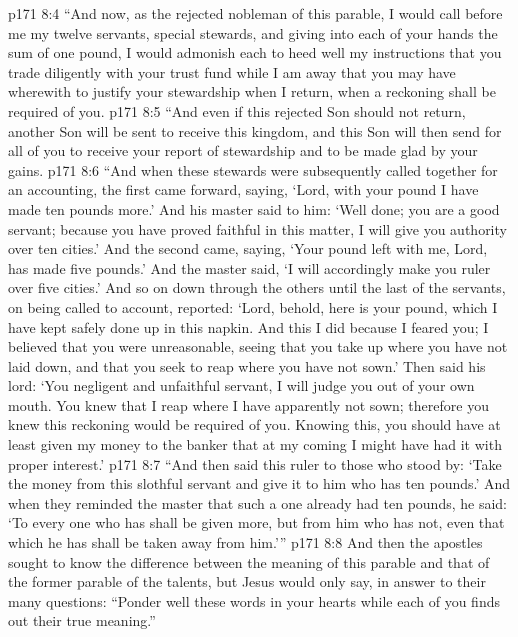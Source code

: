 \vs p171 8:4 \textcolor{ubdarkred}{“And now, as the rejected nobleman of this parable, I would call before me my twelve servants, special stewards, and giving into each of your hands the sum of one pound, I would admonish each to heed well my instructions that you trade diligently with your trust fund while I am away that you may have wherewith to justify your stewardship when I return, when a reckoning shall be required of you.}
\vs p171 8:5 \textcolor{ubdarkred}{“And even if this rejected Son should not return, another Son will be sent to receive this kingdom, and this Son will then send for all of you to receive your report of stewardship and to be made glad by your gains.}
\vs p171 8:6 \textcolor{ubdarkred}{“And when these stewards were subsequently called together for an accounting, the first came forward, saying, ‘Lord, with your pound I have made ten pounds more.’ And his master said to him: ‘Well done; you are a good servant; because you have proved faithful in this matter, I will give you authority over ten cities.’ And the second came, saying, ‘Your pound left with me, Lord, has made five pounds.’ And the master said, ‘I will accordingly make you ruler over five cities.’ And so on down through the others until the last of the servants, on being called to account, reported: ‘Lord, behold, here is your pound, which I have kept safely done up in this napkin. And this I did because I feared you; I believed that you were unreasonable, seeing that you take up where you have not laid down, and that you seek to reap where you have not sown.’ Then said his lord: ‘You negligent and unfaithful servant, I will judge you out of your own mouth. You knew that I reap where I have apparently not sown; therefore you knew this reckoning would be required of you. Knowing this, you should have at least given my money to the banker that at my coming I might have had it with proper interest.’}
\vs p171 8:7 \textcolor{ubdarkred}{“And then said this ruler to those who stood by: ‘Take the money from this slothful servant and give it to him who has ten pounds.’ And when they reminded the master that such a one already had ten pounds, he said: ‘To every one who has shall be given more, but from him who has not, even that which he has shall be taken away from him.’”}
\pc \vs p171 8:8 And then the apostles sought to know the difference between the meaning of this parable and that of the former parable of the talents, but Jesus would only say, in answer to their many questions: \textcolor{ubdarkred}{“Ponder well these words in your hearts while each of you finds out their true meaning.”}
